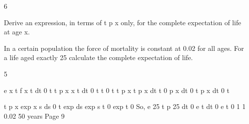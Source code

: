 \documentclass[a4paper,12pt]{article}
\begin{document}
6
\item  Derive an expression, in terms of t p x only, for the complete expectation of life
at age x.

\item  In a certain population the force of mortality is constant at 0.02 for all ages.
For a life aged exactly 25 calculate the complete expectation of life.

5
\item 
e x
t f x t dt
0
t
t
p x
x t
dt
0
t
t
0
t
t
p x
t
p x dt
t
0
p x dt
0
t
p x dt
0
t
\item 
t
p x
exp
x s ds
0
t
exp
ds
exp
s
t
0
exp
t
0
So,
e 25
t
p 25 dt
0
e
t
dt
0
e
t
0
1
1
0.02
50 years
Page 9 %
\end{document}
